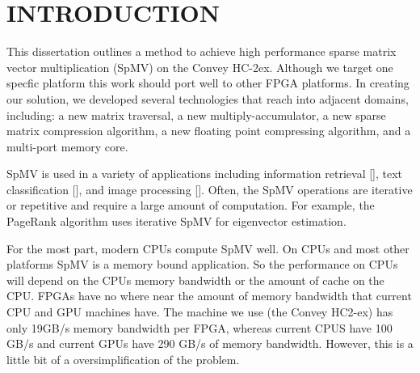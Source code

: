 \chapter{INTRODUCTION}
\label{chp:introduction}
This dissertation outlines a method to achieve high performance sparse matrix vector multiplication (SpMV) on the Convey HC-2ex. Although we target one specfic platform this work should port well to other FPGA platforms. In creating our solution, we developed several technologies that reach into adjacent domains, including: a new matrix traversal, a new multiply-accumulator, a new sparse matrix compression algorithm, a new floating point compressing algorithm, and a multi-port memory core.

\par SpMV is used in a variety of applications including information retrieval [\cite{prelim:page}], text classification [\cite{prelim:townsend2}], and image processing [\cite{prelim:wang}]. Often, the SpMV operations are iterative or repetitive and require a large amount of computation. For example, the PageRank algorithm uses iterative SpMV for eigenvector estimation.

\par For the most part, modern CPUs compute SpMV well. On CPUs and most other platforms SpMV is a memory bound application. So the performance on CPUs will depend on the CPUs memory bandwidth or the amount of cache on the CPU. FPGAs have no where near the amount of memory bandwidth that current CPU and GPU machines have. The machine we use (the Convey HC2-ex) has only 19GB/s memory bandwidth per FPGA, whereas current CPUS have 100 GB/s and current GPUs have 290 GB/s of memory bandwidth. However, this is a little bit of a oversimplification of the problem.


